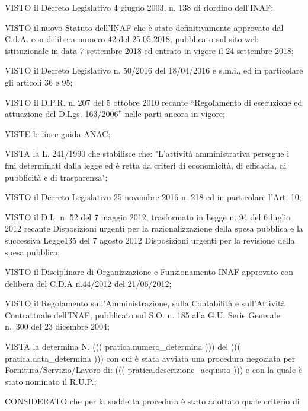 \documentclass[a4paper,12pt]{letter}
\begin{document}
\begin{list}{RISCONTRATA}{}


\item[VISTO] il Decreto Legislativo 4 giugno 2003, n. 138 di riordino dell'INAF;
\item[VISTO] il nuovo Statuto dell'INAF che \`e stato definitivamente approvato dal
             C.d.A. con delibera numero 42 del 25.05.2018, pubblicato sul sito web
             istituzionale in data 7 settembre 2018 ed entrato in vigore il 24 settembre 2018;
\item[VISTO]  il Decreto Legislativo n. 50/2016 del 18/04/2016 e s.m.i., ed in particolare
             gli articoli 36 e 95;
\item[VISTO] il D.P.R. n. 207 del 5 ottobre 2010 recante “Regolamento di esecuzione
             ed attuazione del D.Lgs. 163/2006” nelle parti ancora in vigore;
\item[VISTE] le linee guida ANAC;
\item[VISTA]  la L. 241/1990 che stabilisce che: "L'attivit\`a amministrativa persegue
             i fini determinati dalla legge ed \`e retta da criteri di economicit\`a, di
             efficacia, di pubblicit\`a e di trasparenza";
\item[VISTO]  il Decreto Legislativo 25 novembre 2016 n. 218 ed in particolare l'Art. 10;
\item[VISTO]  il D.L. n. 52 del 7 maggio 2012, trasformato in Legge n. 94 del 6 luglio
             2012 recante Disposizioni urgenti per la razionalizzazione della spesa
             pubblica e la successiva Legge135 del 7 agosto 2012 Disposizioni urgenti per
             la revisione della spesa pubblica;
\item[VISTO] il Disciplinare di Organizzazione e Funzionamento INAF approvato con delibera
             del C.D.A n.44/2012 del 21/06/2012;
\item[VISTO] il Regolamento sull'Amministrazione, sulla Contabilit\`a e sull'Attivit\`a
             Contrattuale dell'INAF, pubblicato sul S.O. n. 185 alla G.U. Serie Generale
             n.~300 del 23 dicembre 2004;
\item[VISTA] la determina N. ((( pratica.numero_determina ))) del ((( pratica.data_determina )))
             con cui \`e stata avviata una procedura negoziata per Fornitura/Servizio/Lavoro di:
             ((( pratica.descrizione_acquisto ))) e con la quale \`e stato nominato il R.U.P.;
\item[CONSIDERATO]  che per la suddetta procedura \`e stato adottato quale criterio di

\end{list}
\end{document}
